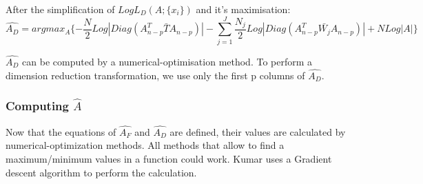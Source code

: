 After the simplification of $Log L_D(A; \{x_i\})$ and it's maximisation:
$$
\hat{A_D} = argmax_A\{-\frac{N}{2} Log|Diag(A_{n - p}^T \bar{T} A_{n - p})| - \sum\limits_{j = 1}^J \frac{N_j}{2} Log|Diag(A_{n - p}^T \bar{W_j} A_{n - p})| + N Log|A|\}
$$

$\hat{A_D}$ can be computed by a numerical-optimisation method.
To perform a dimension reduction transformation, we use only the first p columns of $\hat{A_D}$.

\subsubsection{Computing $\hat A$}

Now that the equations of $\hat{A_F}$ and $\hat{A_D}$ are defined, their values are calculated by numerical-optimization methods.
All methods that allow to find a maximum/minimum values in a function could work.
Kumar\cite{kumar.1997} uses a Gradient descent algorithm to perform the calculation.
